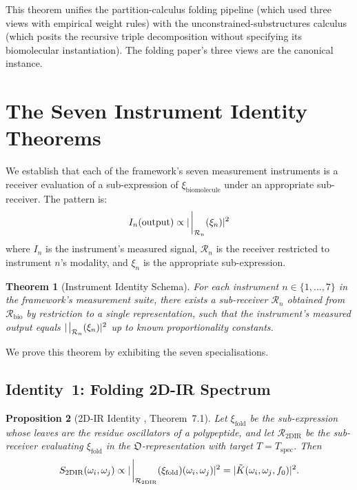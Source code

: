 \documentclass[11pt,twocolumn,a4paper]{article}
\newtheorem{theorem}{Theorem}[section]
\newtheorem{proposition}[theorem]{Proposition}
\theoremstyle{definition}
\theoremstyle{remark}
\newcommand{\Recv}{\mathcal{R}}
\newcommand{\Osc}{\mathfrak{O}}
\newcommand{\Sexp}{\xi}
\begin{document}
This theorem unifies the partition-calculus folding pipeline (which used three views with empirical weight rules) with the unconstrained-substructures calculus (which posits the recursive triple decomposition without specifying its biomolecular instantiation). The folding paper's three views are the canonical instance.

\section{The Seven Instrument Identity Theorems}
\label{sec:identity_theorems}

We establish that each of the framework's seven measurement instruments is a receiver evaluation of a sub-expression of $\Sexp_{\mathrm{biomolecule}}$ under an appropriate sub-receiver. The pattern is:
\begin{equation}
I_n(\text{output}) \propto |\eval_{\Recv_n}(\Sexp_n)|^2
\label{eq:identity_schema}
\end{equation}
where $I_n$ is the instrument's measured signal, $\Recv_n$ is the receiver restricted to instrument $n$'s modality, and $\Sexp_n$ is the appropriate sub-expression.

\begin{theorem}[Instrument Identity Schema]
\label{thm:instrument_schema}
For each instrument $n \in \{1, \ldots, 7\}$ in the framework's measurement suite, there exists a sub-receiver $\Recv_n$ obtained from $\Recv_{\mathrm{bio}}$ by restriction to a single representation, such that the instrument's measured output equals $|\eval_{\Recv_n}(\Sexp_n)|^2$ up to known proportionality constants.
\end{theorem}

We prove this theorem by exhibiting the seven specialisations.

\subsection{Identity~1: Folding 2D-IR Spectrum}

\begin{proposition}[2D-IR Identity \citep{sachikonye2025fold}, Theorem~7.1]
\label{prop:id_2dir}
Let $\Sexp_{\mathrm{fold}}$ be the sub-expression whose leaves are the residue oscillators of a polypeptide, and let $\Recv_{\mathrm{2DIR}}$ be the sub-receiver evaluating $\Sexp_{\mathrm{fold}}$ in the $\Osc$-representation with target $T = T_{\mathrm{spec}}$. Then
\begin{equation}
S_{\mathrm{2DIR}}(\omega_i, \omega_j) \propto |\eval_{\Recv_{\mathrm{2DIR}}}(\Sexp_{\mathrm{fold}})(\omega_i, \omega_j)|^2 = |\tilde{K}(\omega_i, \omega_j, f_0)|^2.
\end{equation}
\end{proposition}
\end{document}
